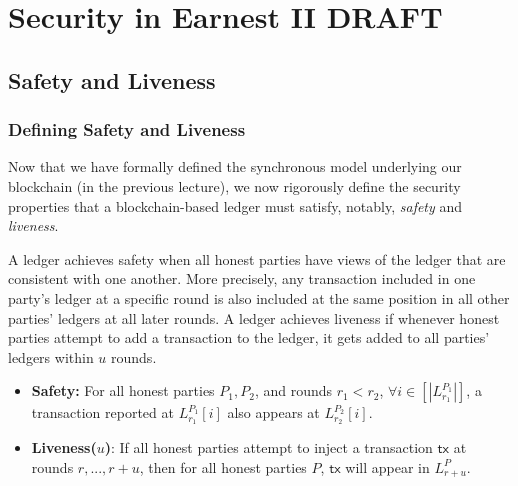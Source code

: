 \chapter{Security in Earnest II \small{\textsf{DRAFT}}}\label{chapter:earnest2}
\section{Safety and Liveness}

\subsection{Defining Safety and Liveness}
Now that we have formally defined the synchronous model underlying our blockchain (in the previous lecture), we now rigorously define the security properties that a blockchain-based ledger must satisfy, notably, \textit{safety} and \textit{liveness}.


A ledger achieves safety when all honest parties have views of the ledger that are consistent with one another. More precisely, any transaction included in one party's ledger at a specific round is also included at the same position in all other parties' ledgers at all later rounds.
A ledger achieves liveness if whenever honest parties attempt to add a transaction to the ledger, it gets added to all parties' ledgers within $u$ rounds.

\begin{itemize}
\item \textbf{Safety:} For all honest parties $P_1, P_2$, and rounds $r_1 < r_2$,
$\forall i \in [|L_{r_1}^{P_1}|]$,
a transaction reported at
$L^{P_1}_{r_1}[i]$ also appears at $L^{P_2}_{r_2}[i]$.

\item \textbf{Liveness($u$)}: If all honest parties attempt to inject a transaction $\mathsf{tx}$ at rounds $r,...,r+u$, then for all honest parties $P$, $\mathsf{tx}$ will appear in $L_{r+u}^P$.
\end{itemize}

